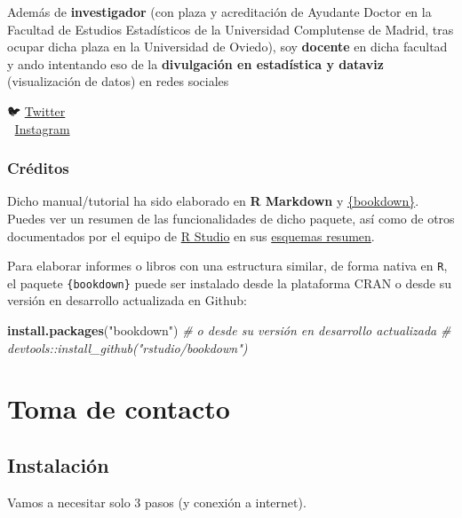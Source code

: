 \documentclass[11pt,]{book}
\newenvironment{Shaded}{\begin{snugshade}}{\end{snugshade}}
\newcommand{\CommentTok}[1]{\textcolor[rgb]{0.37,0.37,0.37}{\textit{#1}}}
\newcommand{\KeywordTok}[1]{\textcolor[rgb]{0.27,0.27,0.27}{\textbf{#1}}}
\newcommand{\NormalTok}[1]{#1}
\newcommand{\StringTok}[1]{\textcolor[rgb]{0.5,0.5,0.5}{#1}}
\begin{document}
Además de \textbf{investigador} (con plaza y acreditación de Ayudante Doctor en la Facultad de Estudios Estadísticos de la Universidad Complutense de Madrid, tras ocupar dicha plaza en la Universidad de Oviedo), soy \textbf{docente} en dicha facultad y ando intentando eso de la \textbf{divulgación en estadística y dataviz} (visualización de datos) en redes sociales

🐦 \href{twitter.com/dadosdelaplace}{Twitter}\\
📸 \href{instagram.com/javieralvarezliebana}{Instagram}

\hypertarget{cruxe9ditos}{%
\section*{Créditos}\label{cruxe9ditos}}


Dicho manual/tutorial ha sido elaborado en \textbf{R Markdown} y \href{https://github.com/rstudio/bookdown}{\{bookdown\}}. Puedes ver un resumen de las funcionalidades de dicho paquete, así como de otros documentados por el equipo de \href{https://www.rstudio.com/}{R Studio} en sus \href{https://www.rstudio.com/resources/cheatsheets/}{esquemas resumen}.

Para elaborar informes o libros con una estructura similar, de forma nativa en \texttt{R}, el paquete \texttt{\{bookdown\}} puede ser instalado desde la plataforma CRAN o desde su versión en desarrollo actualizada en Github:

\begin{Shaded}
\begin{Highlighting}[]
\KeywordTok{install.packages}\NormalTok{(}\StringTok{"bookdown"}\NormalTok{)}
\CommentTok{# o desde su versión en desarrollo actualizada}
\CommentTok{# devtools::install_github("rstudio/bookdown")}
\end{Highlighting}
\end{Shaded}

\hypertarget{part-toma-de-contacto}{%
\part{Toma de contacto}\label{part-toma-de-contacto}}

\hypertarget{instalacionR}{%
\chapter{Instalación}\label{instalacionR}}

Vamos a necesitar solo 3 pasos (y conexión a internet).
\end{document}
